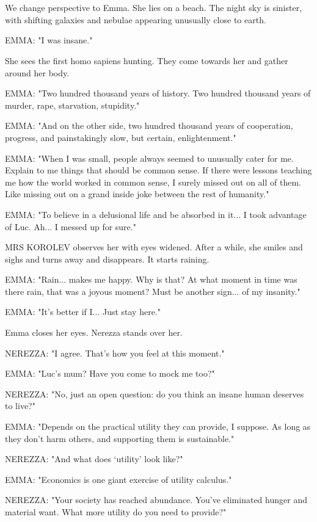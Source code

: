 \documentclass[11pt]{article}
\begin{document}
\ 

\ 

We change perspective to Emma. 
She lies on a beach.
The night sky is sinister, with shifting galaxies and nebulae appearing unusually close to earth.

EMMA: "I was insane."

She sees the first homo sapiens hunting.
They come towards her and gather around her body.

EMMA: "Two hundred thousand years of history.
Two hundred thousand years of murder, rape, starvation, stupidity."

EMMA: "And on the other side, two hundred thousand years of cooperation, progress, and painstakingly slow, but certain, enlightenment."

EMMA: "When I was small, people always seemed to unusually cater for me.
Explain to me things that should be common sense.
If there were lessons teaching me how the world worked in common sense, I surely missed out on all of them.
Like missing out on a grand inside joke between the rest of humanity."

EMMA: "To believe in a delusional life and be absorbed in it...
I took advantage of Luc.
Ah... I messed up for sure."

MRS KOROLEV observes her with eyes widened.
After a while, she smiles and sighs and turns away and disappears.
It starts raining.

EMMA: "Rain... makes me happy. 
Why is that?
At what moment in time was there rain, that was a joyous moment?
Must be another sign... of my insanity."

EMMA: "It's better if I... 
Just stay here."

Emma closes her eyes.
Nerezza stands over her. 

NEREZZA: "I agree. 
That's how you feel at this moment."

EMMA: "Luc's mum? Have you come to mock me too?"

NEREZZA: "No, just an open question: do you think an insane human deserves to live?"

EMMA: "Depends on the practical utility they can provide, I suppose.
As long as they don't harm others, and supporting them is sustainable."

NEREZZA: "And what does `utility' look like?"

EMMA: "Economics is one giant exercise of utility calculus."

NEREZZA: "Your society has reached abundance.
You've eliminated hunger and material want.
What more utility do you need to provide?"
\end{document}
